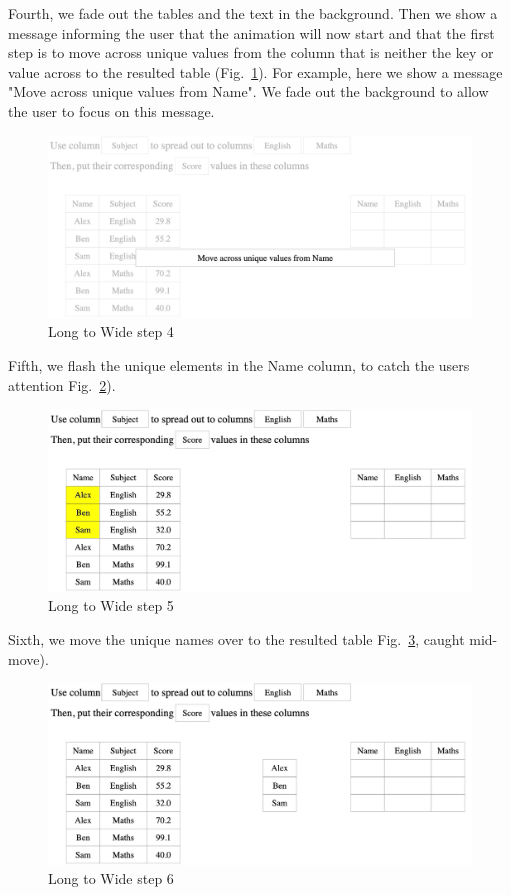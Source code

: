 Fourth, we fade out the tables and the text in the background. Then we show a message informing the user that the animation will now start and that the first step is to move across unique values from the column that is neither the key or value across to the resulted table (Fig.~\ref{fig:spread4}). For example, here we show a message "Move across unique values from Name". We fade out the background to allow the user to focus on this message.
\begin{figure}[H]
    \includegraphics[scale = 0.35]{Masters-Thesis/img/spread4.png}
    \caption{Long to Wide step 4}
    \label{fig:spread4}
\end{figure}

Fifth, we flash the unique elements in the Name column, to catch the users attention Fig.~\ref{fig:spread5}).
\begin{figure}[H]
    \includegraphics[scale = 0.35]{Masters-Thesis/img/spread5.png}
    \caption{Long to Wide step 5}
    \label{fig:spread5}
\end{figure}
\newpage
Sixth, we move the unique names over to the resulted table Fig.~\ref{fig:spread6}, caught mid-move).
\begin{figure}[H]
    \includegraphics[scale = 0.35]{Masters-Thesis/img/spread6.png}
    \caption{Long to Wide step 6}
    \label{fig:spread6}
\end{figure}

